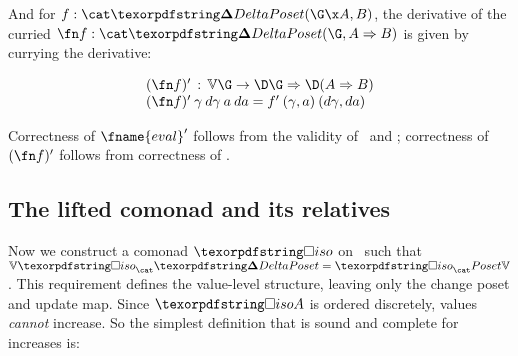 \documentclass[nomarginums]{rntz}\usepackage[tablet]{fantasy}%
\newcommand\mathvar[1]{\ensuremath{#1}} %
\begin{document}
\noindent
And for $f : \CP(\G \x A, B)$, the derivative of the curried $\fn f : \CP(\G,
\expO A B)$ is given by currying the derivative:

\[
\begin{array}{l}
  \deriv{(\fn f)} \,:\, \vals\G \to \expO{\chgs \G}{\chgs{(\expO A B)}}\\
  \deriv{(\fn f)} \<\gamma \<\mathvar{d\gamma} \<a \<\da
  = \deriv f \<(\gamma,a) \<(\mathvar{d\gamma}, \da)
\end{array}
\]

\noindent
Correctness of $\deriv{\fname{eval}}$ follows from the validity of \df\ and \da;
correctness of $\deriv{(\fn f)}$ follows from correctness of .



%



\subsection{The lifted \iso{} comonad and its relatives}
\label{sec:CP-iso}

Now we construct a comonad $\iso$ on \CP\ such that $\valfn\iso_\CP =
\iso_\Poset\valfn$. This requirement defines the value-level structure, leaving
only the change poset and update map. Since $\isof A$ is ordered discretely,
values \emph{cannot} increase. So the simplest definition that is sound and
complete for increases is:
\end{document}
